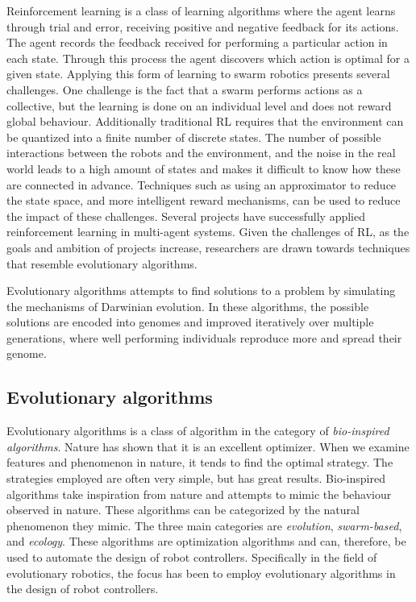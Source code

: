Reinforcement learning is a class of learning algorithms where the agent learns through trial and error, receiving positive and negative feedback for its actions\cite{brambilla_swarm_2013}.
The agent records the feedback received for performing a particular action in each state.
Through this process the agent discovers which action is optimal for a given state.
Applying this form of learning to swarm robotics presents several challenges.
One challenge is the fact that a swarm performs actions as a collective, but the learning is done on an individual level and does not reward global behaviour\cite{brambilla_swarm_2013}.
Additionally traditional RL requires that the environment can be quantized into a finite number of discrete states\cite{schmidhuber_evolutionary_2000, brambilla_swarm_2013}.
The number of possible interactions between the robots and the environment, and the noise in the real world leads to a high amount of states and makes it difficult to know how these are connected in advance\cite{schmidhuber_evolutionary_2000}.
Techniques such as using an approximator\cite{brambilla_swarm_2013} to reduce the state space, and more intelligent reward mechanisms\cite{brambilla_swarm_2013}, can be used to reduce the impact of these challenges.
Several projects\cite{li_learning_2004, balch_behavioral_1998, mataric_interaction_1994} have successfully applied reinforcement learning in multi-agent systems.
Given the challenges of RL, as the goals and ambition of projects increase, researchers are drawn towards techniques that resemble evolutionary algorithms\cite{schmidhuber_evolutionary_2000}.

Evolutionary algorithms attempts to find solutions to a problem by simulating the mechanisms of Darwinian evolution\cite{trianni_evolving_2004}.
In these algorithms, the possible solutions are encoded into genomes and improved iteratively over multiple generations, where well performing individuals reproduce more and spread their genome.



\subsection{Evolutionary algorithms}
\label{sec:evo_alg}
Evolutionary algorithms is a class of algorithm in the category of \emph{bio-inspired algorithms}\cite{binitha_survey_2012}.
Nature has shown that it is an excellent optimizer.
When we examine features and phenomenon in nature, it tends to find the optimal strategy.
The strategies employed are often very simple, but has great results.
Bio-inspired algorithms take inspiration from nature and attempts to mimic the behaviour observed in nature.
These algorithms can be categorized by the natural phenomenon they mimic.
The three main categories are \emph{evolution}, \emph{swarm-based}, and \emph{ecology}\cite{binitha_survey_2012}. 
These algorithms are optimization algorithms and can, therefore, be used to automate the design of robot controllers.
Specifically in the field of evolutionary robotics, the focus has been to employ evolutionary algorithms in the design of robot controllers.


